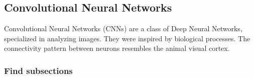 \subsection{Convolutional Neural Networks}
\par
Convolutional Neural Networks (CNNs) are a class of Deep Neural Networks,
specialized in analyzing images. They were inspired by biological processes.
The connectivity pattern between neurons resembles the animal visual cortex.
\cite{cnn} \par

\subsubsection{Find subsections}
